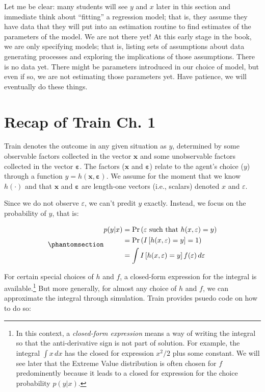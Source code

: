 \documentclass[
  letterpaper,
  DIV=11,
  numbers=noendperiod]{scrreprt}
\begin{document}
Let me be clear: many students will see \(y\) and \(x\) later in this
section and immediate think about ``fitting'' a regression model; that
is, they assume they have data that they will put into an estimation
routine to find estimates of the parameters of the model. We are not
there yet! At this early stage in the book, we are only specifying
models; that is, listing sets of assumptions about data generating
processes and exploring the implications of those assumptions. There is
no data yet. There might be parameters introduced in our choice of
model, but even if so, we are not estimating those parameters yet. Have
patience, we will eventually do these things.

\section{Recap of Train Ch. 1}\label{recap-of-train-ch.-1}

Train denotes the outcome in any given situation as \(y\), determined by
some observable factors collected in the vector \(\mathbf{x}\) and some
unobservable factors collected in the vector
\(\boldsymbol{\varepsilon}\). The factors (\(\mathbf{x}\) and
\(\boldsymbol{\varepsilon}\)) relate to the agent's choice (\(y\))
through a function \(y = h(\mathbf{x}, \boldsymbol{\varepsilon})\). We
assume for the moment that we know \(h(\cdot)\) and that \(\mathbf{x}\)
and \(\boldsymbol{\varepsilon}\) are length-one vectors (i.e., scalars)
denoted \(x\) and \(\varepsilon\).

Since we do not observe \(\varepsilon\), we can't predit \(y\) exactly.
Instead, we focus on the probability of \(y\), that is:

\begin{equation}\phantomsection\label{eq-int_indicator}{
\begin{align}
p(y|x) 
&= \Pr \left( \varepsilon \textrm{ such that } h(x,\varepsilon)=y \right) \\
&= \Pr \left( I \left[ h(x,\varepsilon)=y \right] = 1 \right) \\
&= \int I \left[ h(x,\varepsilon)=y \right] f(\varepsilon) \, d\varepsilon
\end{align}
}\end{equation}

For certain special choices of \(h\) and \(f\), a closed-form expression
for the integral is available.\footnote{In this context, a
  \emph{closed-form expression} means a way of writing the integral so
  that the anti-derivative sign is not part of solution. For example,
  the integral \(\int x \, dx\) has the closed for expression \(x^2/2\)
  plus some constant. We will see later that the Extreme Value
  distribution is often chosen for \(f\) predominently because it leads
  to a closed for expression for the choice probability \(p(y|x)\).} But
more generally, for almost any choice of \(h\) and \(f\), we can
approximate the integral through simulation. Train provides psuedo code
on how to do so:
\end{document}
